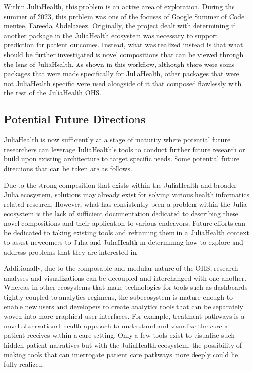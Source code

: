 \documentclass{juliacon}
\begin{document}
Within JuliaHealth, this problem is an active area of exploration.
During the summer of 2023, this problem was one of the focuses of Google Summer of Code mentee, Fareeda Abdelazeez.
Originally, the project dealt with determining if another package in the JuliaHealth ecosystem was necessary to support prediction for patient outcomes.
Instead, what was realized instead is that what should be further investigated is novel compositions that can be viewed through the lens of JuliaHealth.
As shown in this workflow, although there were some packages that were made specifically for JuliaHealth, other packages that were not JuliaHealth specific were used alongside of it that composed flawlessly with the rest of the JuliaHealth OHS.

\subsection{Potential Future Directions}

JuliaHealth is now sufficiently at a stage of maturity where potential future researchers can leverage JuliaHealth's tools to conduct further future research or build upon existing architecture to target specific needs.
Some potential future directions that can be taken are as follows.

Due to the strong composition that exists within the JuliaHealth and broader Julia ecosystem, solutions may already exist for solving various health informatics related research.
However, what has consistently been a problem within the Julia ecosystem is the lack of sufficient documentation dedicated to describing these novel compositions and their application to various endeavors.
Future efforts can be dedicated to taking existing tools and reframing them in a JuliaHealth context to assist newcomers to Julia and JuliaHealth in determining how to explore and address problems that they are interested in.

Additionally, due to the composable and modular nature of the OHS, research analyses and visualizations can be decoupled and interchanged with one another.
Whereas in other ecosystems that make technologies for tools such as dashboards tightly coupled to analytics regimens, the subecosystem is mature enough to enable new users and developers to create analytics tools that can be separately woven into more graphical user interfaces.
For example, treatment pathways is a novel observational health approach to understand and visualize the care a patient receives within a care setting.
Only a few tools exist to visualize such hidden patient narratives but with the JuliaHealth ecosystem, the possibility of making tools that can interrogate patient care pathways more deeply could be fully realized.
\end{document}

